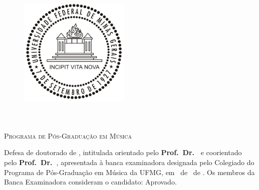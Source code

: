 
\begin{figure}[h]
    \vspace{-2cm}
    \centering  
    \includegraphics[scale=0.5]{arquivos/pre-texto/Logo_UFMG.png}\label{fig:logo}
\end{figure}

    \vspace{-1cm}
\begin{center}
    \vspace{0.5cm}
    \textsc{\instituicao}\\
    \textsc{\centro}\\
    \textsc{Programa de Pós-Graduação em Música}
\end{center}

\noindent
Defesa de doutorado de \textbf{\autor}, intitulada \textbf{\titulo} orientado pelo \textbf{Prof.\ Dr.\ \orientador} e coorientado pelo \textbf{Prof.\ Dr.\ \coorientador}, apresentada à banca examinadora designada pelo Colegiado do Programa de Pós-Graduação em Música da UFMG, em \dia\ de \mes\ de \ano. Os membros da Banca Examinadora consideram o candidato: Aprovado.

